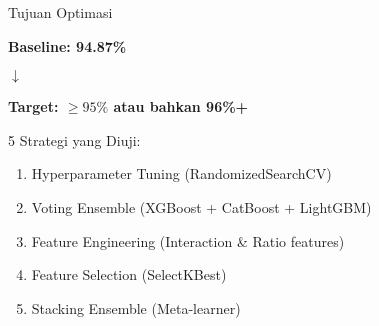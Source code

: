 \documentclass[aspectratio=169]{beamer}
\begin{document}
\begin{frame}{Tujuan Optimasi}
\begin{center}
\Large
\textbf{Baseline: 94.87\%}

\vspace{0.5cm}
\Huge
$\downarrow$

\vspace{0.5cm}
\textbf{\color{darkgreen}Target: $\geq 95\%$ atau bahkan 96\%+}
\end{center}

\vspace{1cm}
\begin{block}{5 Strategi yang Diuji:}
\begin{enumerate}
    \item Hyperparameter Tuning (RandomizedSearchCV)
    \item Voting Ensemble (XGBoost + CatBoost + LightGBM)
    \item Feature Engineering (Interaction \& Ratio features)
    \item Feature Selection (SelectKBest)
    \item Stacking Ensemble (Meta-learner)
\end{enumerate}
\end{block}
\end{frame}
\end{document}
